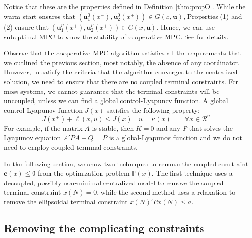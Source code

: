 \documentclass[10pt, twocolumn]{article}
\newcommand{\bu}{\mathbf{u}}
\theoremstyle{definition}
\begin{document}
Notice that these are the properties defined in Definition \ref{thm:propO}. While the warm start ensures that $(\bu_1^0(x^+), \bu_2^0(x^+)) \in G(x,\bu)$, Properties (1) and (2) ensure that $(\bu_1^{p}(x^+),\bu_2^{p}(x^+)) \in G(x,\bu)$. Hence, we can use suboptimal MPC to show the stability of cooperative MPC. See  \citep{stewart:venkat:rawlings:wright:pannocchia:2010} for details.   

Observe that the cooperative MPC algorithm satisfies all the
requirements that we outlined the previous section, most notably, the
absence of any coordinator. However, to satisfy the criteria that the
algorithm converges to the centralized solution, we need to ensure
that there are no coupled terminal constraints. For most systems, we
cannot guarantee that the terminal constraints will be uncoupled,
unless we can find a global control-Lyapunov function. A global
control-Lyapunov function $J(x)$ satisfies the following property:
\[ J(x^+) + \ell(x,u) \leq J(x) \quad u = \kappa (x) \qquad \forall x
\in \mathcal{R}^n 
\]
For example, if the matrix $A$ is stable, then $K=0$ and any $P$ that
solves the Lyapunov equation $A'PA+Q=P$ is a global-Lyapunov function
and we do not need to employ coupled-terminal constraints. 


In the following section, we show two techniques to  remove the coupled constraint $\mathbf{c}(x) \leq 0$ from the optimization problem $\mathbb{P}(x)$. The first technique uses a decoupled, possibly non-minimal centralized model to remove the coupled terminal constraint $x(N) = 0$, while the second method uses a relaxation to remove the ellipsoidal terminal constraint $x(N)'Px(N) \leq a$. 

\subsection{Removing the complicating constraints}
\label{sec:relax}
\end{document}
